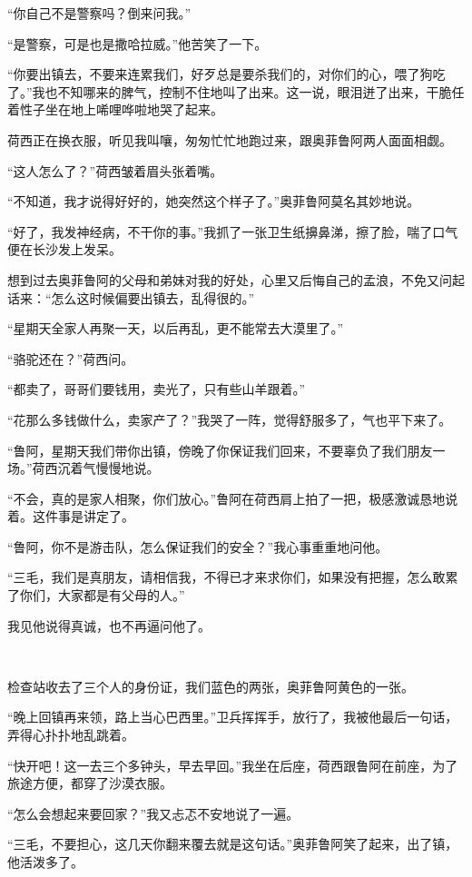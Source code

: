 \par “你自己不是警察吗？倒来问我。”
\par “是警察，可是也是撒哈拉威。”他苦笑了一下。
\par “你要出镇去，不要来连累我们，好歹总是要杀我们的，对你们的心，喂了狗吃了。”我也不知哪来的脾气，控制不住地叫了出来。这一说，眼泪迸了出来，干脆任着性子坐在地上唏哩哗啦地哭了起来。
\par 荷西正在换衣服，听见我叫嚷，匆匆忙忙地跑过来，跟奥菲鲁阿两人面面相觑。
\par “这人怎么了？”荷西皱着眉头张着嘴。
\par “不知道，我才说得好好的，她突然这个样子了。”奥菲鲁阿莫名其妙地说。
\par “好了，我发神经病，不干你的事。”我抓了一张卫生纸擤鼻涕，擦了脸，喘了口气便在长沙发上发呆。
\par 想到过去奥菲鲁阿的父母和弟妹对我的好处，心里又后悔自己的孟浪，不免又问起话来：“怎么这时候偏要出镇去，乱得很的。”
\par “星期天全家人再聚一天，以后再乱，更不能常去大漠里了。”
\par “骆驼还在？”荷西问。
\par “都卖了，哥哥们要钱用，卖光了，只有些山羊跟着。”
\par “花那么多钱做什么，卖家产了？”我哭了一阵，觉得舒服多了，气也平下来了。
\par “鲁阿，星期天我们带你出镇，傍晚了你保证我们回来，不要辜负了我们朋友一场。”荷西沉着气慢慢地说。
\par “不会，真的是家人相聚，你们放心。”鲁阿在荷西肩上拍了一把，极感激诚恳地说着。这件事是讲定了。
\par “鲁阿，你不是游击队，怎么保证我们的安全？”我心事重重地问他。
\par “三毛，我们是真朋友，请相信我，不得已才来求你们，如果没有把握，怎么敢累了你们，大家都是有父母的人。”
\par 我见他说得真诚，也不再逼问他了。
\par  
\par 检查站收去了三个人的身份证，我们蓝色的两张，奥菲鲁阿黄色的一张。
\par “晚上回镇再来领，路上当心巴西里。”卫兵挥挥手，放行了，我被他最后一句话，弄得心扑扑地乱跳着。
\par “快开吧！这一去三个多钟头，早去早回。”我坐在后座，荷西跟鲁阿在前座，为了旅途方便，都穿了沙漠衣服。
\par “怎么会想起来要回家？”我又忐忑不安地说了一遍。
\par “三毛，不要担心，这几天你翻来覆去就是这句话。”奥菲鲁阿笑了起来，出了镇，他活泼多了。
